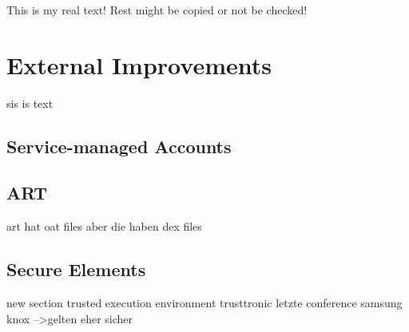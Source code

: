This is my real text! Rest might be copied or not be checked!


\section{External Improvements} \label{section:evaluation-setion}
sis is text
\subsection{Service-managed Accounts}
\subsection{ART}
art hat oat files aber die haben dex files
\subsection{Secure Elements}


new section trusted execution environment
trusttronic letzte conference
samsung knox
-->gelten eher sicher
